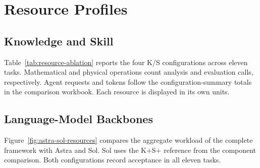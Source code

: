 \section{Resource Profiles}
\label{app:cross-model-profile}
\subsection{Knowledge and Skill}
Table~\ref{tab:resource-ablation} reports the four K/S configurations across eleven tasks. Mathematical and physical operations count analysis and evaluation calls, respectively. Agent requests and tokens follow the configuration-summary totals in the comparison workbook. Each resource is displayed in its own units.


\subsection{Language-Model Backbones}
Figure~\ref{fig:astra-sol-resources} compares the aggregate workload of the complete framework with Astra and Sol. Sol uses the K$+$S$+$ reference from the component comparison. Both configurations record acceptance in all eleven tasks.

